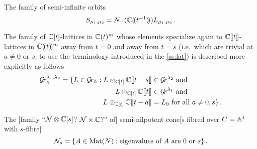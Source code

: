\documentclass[draft]{article}
\begin{document}
The family of semi-infinite orbits 
\begin{equation}
    S_{\mu_1,\mu_2} = N_-(\CC\xT[t^{-1}]) L_{\mu_1,\mu_2}\,. 
\end{equation}

The family  of $\CC[t]$-lattices in $\CC(t)^m$ whose elements specialize again to $\CC\xt$-lattices in $\CC\xT^m$ away from $t = 0$ and away from $t = s$ (i.e.\ which are trivial at $a \ne 0$ or $s$, to use the terminology introduced in the \cref{ss:lat}) is described more explicitly as follows
\begin{equation}
    \label{eq:defGrBDlambda}
    \begin{split}
        \Gr_{\AA}^{\lambda_1,\lambda_2} = 
        \{L \in\Grbd : 
        L \otimes_{\CC[t]} \CC\xt[t-s] 
        &\in \Gr^{\lambda_2} \text{ and } \\
        L\otimes_{\CC[t]} \CC\xt &\in \Gr^{\lambda_1} \text{ and } \\ 
        L \otimes_{\CC[t]} \CC\xt[t-a] &= L_0 \text{ for all $ a \ne 0, s$} \}\,.
    \end{split}
\end{equation}

% 

The [family ``$\cN\otimes\CC[s]$? $\cN\times\CC$?'' of] semi-nilpotent cone[s fibred over $C = \AA^1$ with $s$-fibre] 
\begin{equation}
    \cN_s = \{A \in \mat(N) : \text{eigenvalues of } A \text{ are } 0 \text{ or }s\}\,.
\end{equation}
\end{document}
